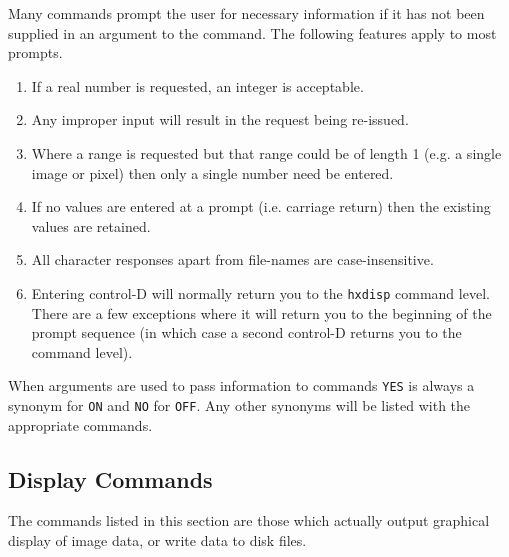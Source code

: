 Many commands prompt the user for necessary information if it has not
been supplied in an argument to the command. The following features
apply to most prompts.
\begin{enumerate}
\item If a real number is requested, an integer is acceptable.
\item Any improper input will result in 
the request being re-issued.
\item Where a range is requested but that range could
be of length 1 (e.g. a single image or pixel) then only a single number
need be entered.
\item If no values are entered at a prompt (i.e. carriage return)
then the existing values are retained.
\item All character responses apart from file-names
are case-insensitive.
\item Entering control-D will normally return you to the \verb!hxdisp!
command level. There are a few exceptions where it will return you to
the beginning of the prompt sequence (in which case a second control-D
returns you to the command level).
\end{enumerate}

When arguments are used to pass information to commands {\tt YES} is
always a synonym for {\tt ON} and {\tt NO} for {\tt OFF}. Any other
synonyms will be listed with the appropriate commands.

\subsection{Display Commands}
 	     
The commands listed in this section are those which actually output
graphical display of image data, or write data to disk files.


